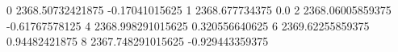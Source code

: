 0 2368.50732421875 -0.17041015625
1 2368.677734375 0.0
2 2368.06005859375 -0.61767578125
4 2368.998291015625 0.320556640625
6 2369.62255859375 0.94482421875
8 2367.748291015625 -0.929443359375
